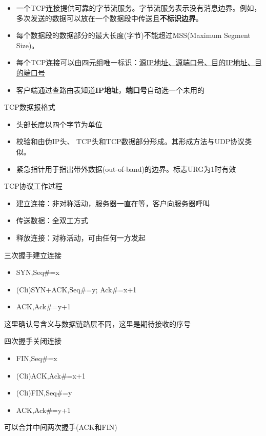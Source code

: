 \begin{itemize}
\item 一个TCP连接提供可靠的字节流服务。字节流服务表示没有消息边界。例如，多次发送的数据可以放在一个数据段中传送且\textbf{不标识边界}。
\item 每个数据段的数据部分的最大长度(字节)不能超过MSS(Maximum Segment Size)。
\item 每个TCP连接可以由四元组唯一标识：\underline{源IP地址、源端口号、目的IP地址、目的端口号}
\item 客户端通过查路由表知道\textbf{IP地址}，\textbf{端口号}自动选一个未用的
\end{itemize}

TCP数据报格式
\begin{itemize}
\item 头部长度以四个字节为单位
\item 校验和由伪IP头、 TCP头和TCP数据部分形成。其形成方法与UDP协议类似。
\item 紧急指针用于指出带外数据(out-of-band)的边界。标志URG为1时有效
\end{itemize}

TCP协议工作过程
\begin{center}
\end{center}
\begin{itemize}
    \item 建立连接：非对称活动，服务器一直在等，客户向服务器呼叫
    \item 传送数据：全双工方式
    \item 释放连接：对称活动，可由任何一方发起
\end{itemize}

三次握手建立连接
\begin{itemize}
    \item SYN,Seq\#=x
    \item (Cli)SYN+ACK,Seq\#=y; Ack\#=x+1
    \item ACK,Ack\#=y+1
\end{itemize}
这里确认号含义与数据链路层不同，这里是期待接收的序号

四次握手关闭连接
\begin{itemize}
    \item FIN,Seq\#=x
    \item (Cli)ACK,Ack\#=x+1
    \item (Cli)FIN,Seq\#=y
    \item ACK,Ack\#=y+1
\end{itemize}
可以合并中间两次握手(ACK和FIN)

